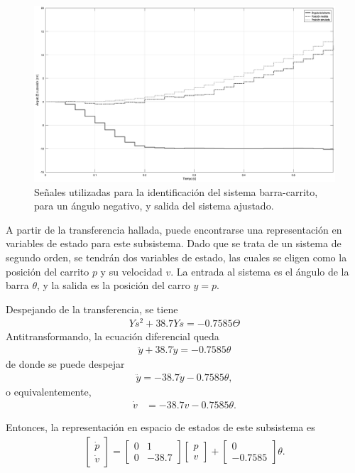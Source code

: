 \begin{figure}[!htbp]
    \centering
    \includegraphics[width=\linewidth]{img/ident-carrito2.eps}
    \caption{Señales utilizadas para la identificación del sistema barra-carrito, para un ángulo negativo, y salida del sistema ajustado.}
    \label{fig:ident-carro2}
\end{figure}

A partir de la transferencia hallada, puede encontrarse una representación en variables de estado para este subsistema. Dado que se trata de un sistema de segundo orden, se tendrán dos variables de estado, las cuales se eligen como la posición del carrito $p$ y su velocidad $v$. La entrada al sistema es el ángulo de la barra $\theta$, y la salida es la posición del carro $y = p$.

Despejando de la transferencia, se tiene
\begin{align*}
    Ys^{2} + 38.7Ys = -0.7585 \Theta
\end{align*}
Antitransformando, la ecuación diferencial queda
\begin{align*}
    \ddot{y} + 38.7 \dot{y} = -0.7585 \theta
\end{align*}
de donde se puede despejar
\begin{align*}
    \ddot{y} = -38.7 \dot{y} - 0.7585 \theta,
\end{align*}
o equivalentemente,
\begin{align*}
    \dot{v} &= -38.7 v - 0.7585 \theta.
\end{align*}

Entonces, la representación en espacio de estados de este subsistema es
\begin{align*}
    \begin{bmatrix} \dot{p} \\ \dot{v} \end{bmatrix} =
        \begin{bmatrix} 0 & 1 \\ 0 & -38.7 \end{bmatrix} \begin{bmatrix} p \\ v \end{bmatrix}
        + \begin{bmatrix} 0 \\ - 0.7585 \end{bmatrix} \theta.
\end{align*}

